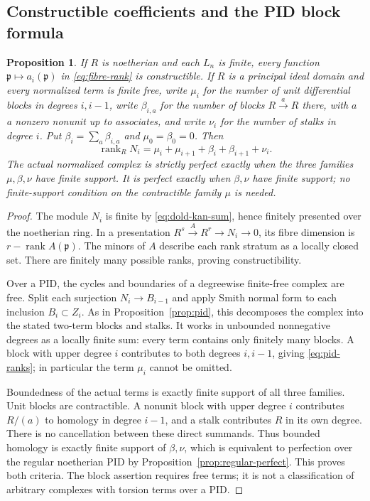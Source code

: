 \documentclass[11pt,a4paper]{article}
\newtheorem{proposition}[theorem]{Proposition}
\theoremstyle{definition}
\begin{document}
\subsection{Constructible coefficients and the PID block formula}
\begin{proposition}\label{prop:constructible-pid}
If $R$ is noetherian and each $L_n$ is finite, every function
$\mathfrak p\mapsto a_i(\mathfrak p)$ in
\eqref{eq:fibre-rank} is constructible. If $R$ is a principal ideal
domain and every normalized term is finite free, write $\mu_i$ for
the number of unit differential blocks in degrees $i,i-1$, write
$\beta_{i,a}$ for the number of blocks $R\xrightarrow{a}R$ there,
with $a$ a nonzero nonunit up to associates, and write $\nu_i$ for
the number of stalks in degree $i$. Put
$\beta_i=\sum_a\beta_{i,a}$ and $\mu_0=\beta_0=0$. Then
\begin{equation}\label{eq:pid-ranks}
 \operatorname{rank}_R N_i
 =\mu_i+\mu_{i+1}+\beta_i+\beta_{i+1}+\nu_i.
\end{equation}
The actual normalized complex is strictly perfect exactly when the
three families $\mu,\beta,\nu$ have finite support. It is perfect
exactly when $\beta,\nu$ have finite support; no finite-support
condition on the contractible family $\mu$ is needed.
\end{proposition}
\begin{proof}
The module $N_i$ is finite by \eqref{eq:dold-kan-sum}, hence finitely
presented over the noetherian ring. In a presentation
$R^s\xrightarrow{A}R^r\to N_i\to0$, its fibre dimension is
$r-\operatorname{rank}A(\mathfrak p)$. The minors of $A$ describe
each rank stratum as a locally closed set. There are finitely many
possible ranks, proving constructibility.

Over a PID, the cycles and boundaries of a degreewise finite-free
complex are free. Split each surjection $N_i\to B_{i-1}$ and
apply Smith normal form to each inclusion $B_i\subset Z_i$.
As in Proposition~\ref{prop:pid}, this decomposes the complex into
the stated two-term blocks and stalks. It works in unbounded
nonnegative degrees as a locally finite sum: every term contains
only finitely many blocks. A block with upper degree $i$ contributes
to both degrees $i,i-1$, giving \eqref{eq:pid-ranks}; in particular
the term $\mu_i$ cannot be omitted.

Boundedness of the actual terms is exactly finite support of all
three families. Unit blocks are contractible. A nonunit block with
upper degree $i$ contributes $R/(a)$ to homology in degree $i-1$,
and a stalk contributes $R$ in its own degree. There is no
cancellation between these direct summands. Thus bounded homology is
exactly finite support of $\beta,\nu$, which is equivalent to
perfection over the regular noetherian PID by
Proposition~\ref{prop:regular-perfect}. This proves both criteria.
The block assertion requires free terms; it is not a classification
of arbitrary complexes with torsion terms over a PID.
\end{proof}
\end{document}
